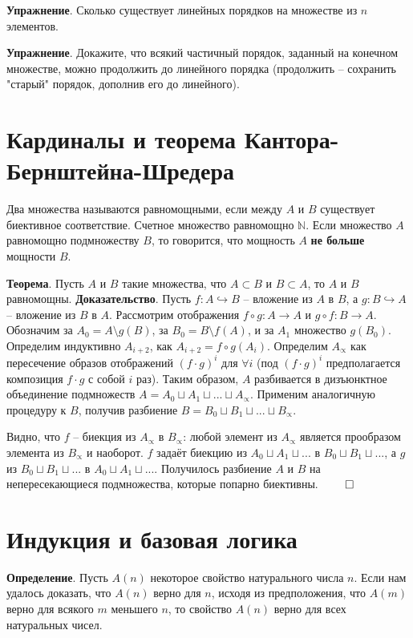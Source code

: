 \documentclass[a4paper]{book}
\begin{document}
\textbf{Упражнение}. Сколько существует линейных порядков на множестве из $n$ элементов. 


\textbf{Упражнение}. Докажите, что всякий частичный порядок, заданный на конечном множестве, можно продолжить до линейного порядка (продолжить -- сохранить "старый" порядок, дополнив его до линейного). 
\section{Кардиналы и теорема Кантора-Бернштейна-Шредера}
Два множества называются равномощными, если между $A$ и $B$ существует биективное соответствие. Счетное множество равномощно $\mathbb{N}$. Если множество $A$ равномощно подмножеству $B$, то говорится, что мощность $A$ \textbf{не больше} мощности $B$. 

\textbf{Теорема}. Пусть $A$ и $B$ такие множества, что $A \subset B$ и $B \subset A$, то $A$ и $B$ равномощны. 
\textbf{Доказательство}. Пусть $f: A\hookrightarrow B$ -- вложение из $A$ в $B$, а $g: B\hookrightarrow A$ -- вложение из $B$ в $A$. Рассмотрим отображения $f \circ g: A \rightarrow A$ и $g\circ f: B\rightarrow A$. Обозначим за $A_0 = A\setminus g(B)$, за $B_0 = B\setminus f(A)$, и за $A_1$ множество $g(B_0)$. Определим индуктивно $A_{i+2}$, как $A_{i+2} = f \circ g(A_i)$. Определим $A_{\propto}$ как пересечение образов отображений $(f\cdot g)^i$ для $\forall i$ (под $(f\cdot g)^i$ предполагается композиция $f\cdot g$ с собой $i$ раз). Таким образом, $A$ разбивается в дизъюнктное объединение подмножеств $A = A_0 \sqcup A_1\sqcup ... \sqcup A_{\propto}$. Применим аналогичную процедуру к $B$, получив разбиение $B = B_0 \sqcup B_1 \sqcup ... \sqcup B_{\propto}$. 

Видно, что $f$ -- биекция из $A_{\propto}$ в $B_{\propto}$: любой элемент из  $A_{\propto}$ является прообразом элемента из $B_{\propto}$ и наоборот. $f$ задаёт биекцию из $A_0 \sqcup A_1\sqcup ...$ в $B_0 \sqcup B_1 \sqcup ...$, а $g$ из $B_0 \sqcup B_1 \sqcup ...$ в $A_0 \sqcup A_1\sqcup ...$. Получилось разбиение $A$ и $B$ на непересекающиеся подмножества, которые попарно биективны. $\qed$

\section{Индукция и базовая логика}

\textbf{Определение}. Пусть $A(n)$ некоторое свойство натурального числа $n$. Если нам удалось доказать, что $A(n)$ верно для $n$, исходя из предположения, что $A(m)$ верно для всякого $m$ меньшего $n$, то свойство $A(n)$ верно для всех натуральных чисел. 
\end{document}
